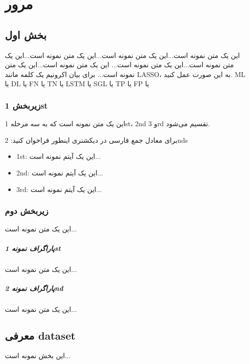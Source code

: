 \chapter{مرور}\label{chap:review}

\section{بخش اول}\label{chap:brain}

این یک متن نمونه است...این یک متن نمونه است...این یک متن نمونه است...این یک متن نمونه است...این یک متن نمونه است... این یک متن نمونه است...این یک متن نمونه است...
برای بیان اکرونیم یک کلمه مانند  \gls{LASSO}، به این صورت عمل کنید.
   \gls{ML}
   یا 
   \gls{DL}
   یا
   \gls{FN}
   یا 
   \gls{TN}
   یا
   \gls{LSTM}
   یا 
   \gls{SGL}
   یا
   \gls{TP}
   یا 
   \gls{FP}
   یا
\subsection{زیربخش \gls*{1st}}\label{sec:brain:sub_brain}
این یک متن نمونه است که به سه مرحله \gls{1st}،
 \gls{2nd} و \gls{3rd} تقسیم می‌شود. 
 
 برای معادل جمع فارسی در دیکشنری اینطور فراخوان کنید: \glspl{2nd}
\begin{itemize}
	\item
	\gls{1st}: 
	این یک آیتم نمونه است...
		\item 
	\gls{2nd}: 
	این یک آیتم نمونه است...
	\item 
	\gls{3rd}: 
	این یک آیتم نمونه است...
\end{itemize}

\subsection{زیربخش دوم}\label{sec:brain:second_sub}
این یک متن نمونه است...


\paragraph{پاراگراف نمونه \gls*{1st}}
این یک متن نمونه است...
\paragraph{پاراگراف نمونه \gls*{2nd}}
این یک متن نمونه است...

\section{معرفی \gls*{dataset}}\label{sec:dataset}
این بخش نمونه است...

